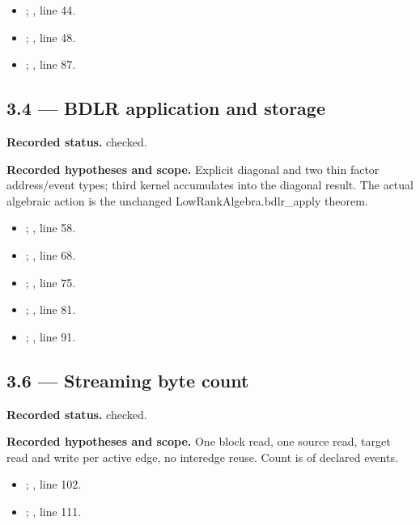 \begin{itemize}
\item {}; , line 44.
\item {}; , line 48.
\item {}; , line 87.
\end{itemize}
\subsection{3.4 — BDLR application and storage}
\label{result:3.4}
\textbf{Recorded status.} checked.

\textbf{Recorded hypotheses and scope.} Explicit diagonal and two thin factor address/event types; third kernel accumulates into the diagonal result. The actual algebraic action is the unchanged LowRankAlgebra.bdlr\_apply theorem.

\begin{itemize}
\item {}; , line 58.
\item {}; , line 68.
\item {}; , line 75.
\item {}; , line 81.
\item {}; , line 91.
\end{itemize}
\subsection{3.6 — Streaming byte count}
\label{result:3.6}
\textbf{Recorded status.} checked.

\textbf{Recorded hypotheses and scope.} One block read, one source read, target read and write per active edge, no interedge reuse. Count is of declared events.

\begin{itemize}
\item {}; , line 102.
\item {}; , line 111.
\end{itemize}
